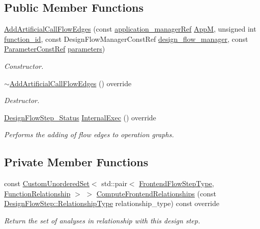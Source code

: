 \subsection*{Public Member Functions}
\begin{DoxyCompactItemize}
\item 
\hyperlink{classAddArtificialCallFlowEdges_ad15a28de47a0eec6a6fc3b4e4659d50b}{Add\+Artificial\+Call\+Flow\+Edges} (const \hyperlink{application__manager_8hpp_a04ccad4e5ee401e8934306672082c180}{application\+\_\+manager\+Ref} \hyperlink{classFrontendFlowStep_a0ac0d8db2a378416583f51c4faa59d15}{AppM}, unsigned int \hyperlink{classFunctionFrontendFlowStep_a58ef2383ad1a212a8d3f396625a4b616}{function\+\_\+id}, const Design\+Flow\+Manager\+Const\+Ref \hyperlink{classDesignFlowStep_ab770677ddf087613add30024e16a5554}{design\+\_\+flow\+\_\+manager}, const \hyperlink{Parameter_8hpp_a37841774a6fcb479b597fdf8955eb4ea}{Parameter\+Const\+Ref} \hyperlink{classDesignFlowStep_a802eaafe8013df706370679d1a436949}{parameters})
\begin{DoxyCompactList}\small\item\em Constructor. \end{DoxyCompactList}\item 
\hyperlink{classAddArtificialCallFlowEdges_a8b1505efc13e743a2725ebb31c8404e2}{$\sim$\+Add\+Artificial\+Call\+Flow\+Edges} () override
\begin{DoxyCompactList}\small\item\em Destructor. \end{DoxyCompactList}\item 
\hyperlink{design__flow__step_8hpp_afb1f0d73069c26076b8d31dbc8ebecdf}{Design\+Flow\+Step\+\_\+\+Status} \hyperlink{classAddArtificialCallFlowEdges_af8c77aa64aec79e8f541b6c9d681f786}{Internal\+Exec} () override
\begin{DoxyCompactList}\small\item\em Performs the adding of flow edges to operation graphs. \end{DoxyCompactList}\end{DoxyCompactItemize}
\subsection*{Private Member Functions}
\begin{DoxyCompactItemize}
\item 
const \hyperlink{classCustomUnorderedSet}{Custom\+Unordered\+Set}$<$ std\+::pair$<$ \hyperlink{frontend__flow__step_8hpp_afeb3716c693d2b2e4ed3e6d04c3b63bb}{Frontend\+Flow\+Step\+Type}, \hyperlink{classFrontendFlowStep_af7cf30f2023e5b99e637dc2058289ab0}{Function\+Relationship} $>$ $>$ \hyperlink{classAddArtificialCallFlowEdges_a9e82def51141fd3a055e1cc4c80fd69c}{Compute\+Frontend\+Relationships} (const \hyperlink{classDesignFlowStep_a723a3baf19ff2ceb77bc13e099d0b1b7}{Design\+Flow\+Step\+::\+Relationship\+Type} relationship\+\_\+type) const override
\begin{DoxyCompactList}\small\item\em Return the set of analyses in relationship with this design step. \end{DoxyCompactList}\end{DoxyCompactItemize}
